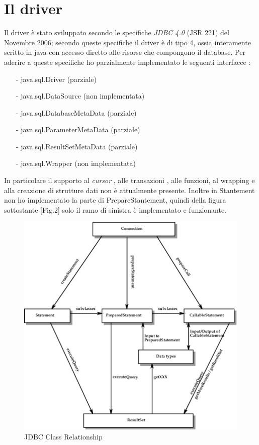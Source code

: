 \section{Il driver}

Il driver è stato sviluppato secondo le specifiche \emph{JDBC 4.0} (JSR 221) del Novembre 2006; secondo queste specifiche il driver è di tipo 4, ossia interamente scritto in java con accesso diretto alle risorse che compongono il database. Per aderire a queste specifiche ho parzialmente implementato le seguenti interfacce : 
\begin{itemize}
\item[-] java.sql.Driver (parziale)
\item[-] java.sql.DataSource (non implementata)
\item[-] java.sql.DatabaseMetaData (parziale)
\item[-] java.sql.ParameterMetaData (parziale)
\item[-] java.sql.ResultSetMetaData (parziale)
\item[-] java.sql.Wrapper (non implementata) 
\end{itemize}

In particolare il supporto al \emph{cursor} , alle transazioni , alle funzioni, al wrapping e alla creazione di strutture dati non è attualmente presente. Inoltre in Stantement non ho implementato la parte di PrepareStantement, quindi della figura sottostante [Fig.2] solo il ramo di sinistra è implementato e funzionante. 



\begin{figure}[ht]
\centering
\includegraphics[width=1\textwidth]{immagini/jdbc.png}
\caption{JDBC Class Relationship}\label{fig:immagini/jdbc.png}
\end{figure}